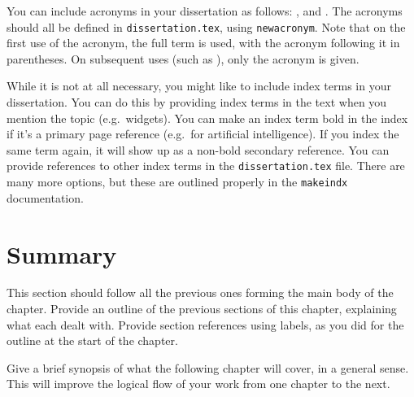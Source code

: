 You can include acronyms in your dissertation as follows: ,  and . The acronyms should all be defined in \texttt{dissertation.tex}, using \texttt{newacronym}. Note that on the first use of the acronym, the full term is used, with the acronym following it in parentheses. On subsequent uses (such as ), only the acronym is given.

While it is not at all necessary, you might like to include index terms in your dissertation. You can do this by providing index terms in the text when you mention the topic (e.g.\ widgets). You can make an index term bold in the index if it's a primary page reference (e.g.\ for artificial intelligence). If you index the same term again, it will show up as a non-bold secondary reference. You can provide references to other index terms in the \texttt{dissertation.tex} file. There are many more options, but these are outlined properly in the \texttt{makeindx} documentation.


\section{Summary}
\label{sec:first:summary}

This section should follow all the previous ones forming the main body of the chapter. Provide an outline of the previous sections of this chapter, explaining what each dealt with. Provide section references using labels, as you did for the outline at the start of the chapter.

Give a brief synopsis of what the following chapter will cover, in a general sense. This will improve the logical flow of your work from one chapter to the next.

